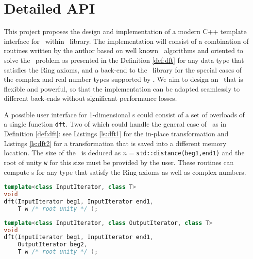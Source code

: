\section{Detailed API}

This project proposes the design and implementation of a modern C++ template
interface for \dft\ within \boostmath\ library. The implementation will consist
of a combination of routines written by the author based on well known \fft\
algorithms and oriented to solve the \dft\ problem as presented in the
Definition \ref{def:dft} for any data type that satisfies the Ring axioms, 
and a back-end to the \fftw\ library for the special cases of
the complex and real number types supported by \fftw. We aim to design an \api\
that is flexible and powerful, so that the implementation can be adapted
seamlessly to different back-ends without significant performance losses.

\lstset{columns=flullflexible,basicstyle=\ttfamily}

A possible user interface for 1-dimensional \dft{}s could 
consist of a set of overloads of a single function \texttt{dft}.
Two of which could handle the general case of \dft\ as in Definition
\ref{def:dft}: see
Listings \ref{ls:dft1} for the in-place transformation 
and Listings \ref{ls:dft2} for a transformation that is saved into a different memory
location. The size of the \dft\ is deduced 
as $n=$\texttt{std::distance(beg1,end1)} and the root of unity \texttt{w} for this
size must be provided by the user. These routines can compute \dft{}s for any
type that satisfy the Ring axioms as well as complex numbers.

\begin{lstlisting}[language=C++,label=ls:dft1,caption=General case of the DFT in-place.]
template<class InputIterator, class T> 
void 
dft(InputIterator beg1, InputIterator end1, 
    T w /* root unity */ );
\end{lstlisting}

\begin{lstlisting}[language=C++,label=ls:dft2,caption=General case of the DFT out-of-place]
template<class InputIterator, class OutputIterator, class T> 
void 
dft(InputIterator beg1, InputIterator end1,
    OutputIterator beg2, 
    T w /* root unity */ );
\end{lstlisting}

